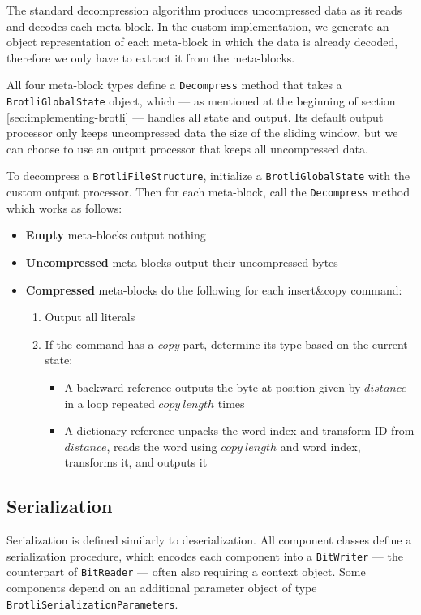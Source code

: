 \documentclass[english,master,dept460,male,cpp,cpdeclaration]{diploma}
\newcommand{\nosep}{\itemsep0em}
\begin{document}
	The standard decompression algorithm produces uncompressed data as it reads and decodes each meta-block. In the custom implementation, we generate an object representation of each meta-block in which the data is already decoded, therefore we only have to extract it from the meta-blocks.
	
	All four meta-block types define a \verb|Decompress| method that takes a \verb|BrotliGlobalState| object, which --- as mentioned at the beginning of section \ref{sec:implementing-brotli} --- handles all state and output. Its default output processor only keeps uncompressed data the size of the sliding window, but we can choose to use an output processor that keeps all uncompressed data.
	
	To decompress a \verb|BrotliFileStructure|, initialize a \verb|BrotliGlobalState| with the custom output processor. Then for each meta-block, call the \verb|Decompress| method which works as follows:
	
	\begin{itemize} \nosep
		\item \textbf{Empty} meta-blocks output nothing
		\item \textbf{Uncompressed} meta-blocks output their uncompressed bytes
		\item \textbf{Compressed} meta-blocks do the following for each insert\&copy command:
			\begin{enumerate} \nosep
				\item Output all literals
				\item If the command has a \emph{copy} part, determine its type based on the current state:
					\begin{itemize}
						\item A backward reference outputs the byte at position given by $distance$ in a loop repeated $copy\ length$ times
						\item A dictionary reference unpacks the word index and transform ID from $distance$, reads the word using $copy\ length$ and word index, transforms it, and outputs it
					\end{itemize}
			\end{enumerate}
	\end{itemize}
	
	\subsection{Serialization}
	\label{sec:serialization}
	
	Serialization is defined similarly to deserialization. All component classes define a serialization procedure, which encodes each component into a \verb|BitWriter| --- the counterpart of \verb|BitReader| --- often also requiring a context object. Some components depend on an additional parameter object of type \verb|BrotliSerializationParameters|.
	
\end{document}
